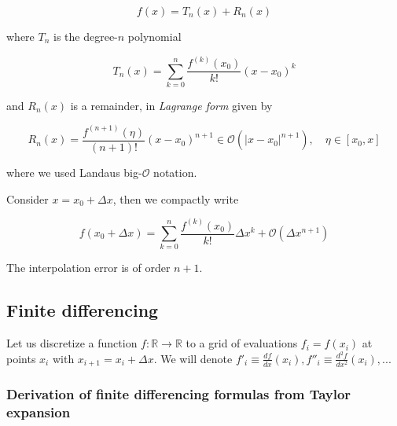 \begin{equation}
    f(x) = T_n(x) + R_n(x)
\end{equation}

where $T_n$ is the degree-$n$ polynomial

\begin{equation}
    T_n(x) = \sum_{k = 0}^{n} \frac{f^{(k)}(x_0)}{k!} (x - x_0)^k
\end{equation}

and $R_n(x)$ is a remainder, in \textit{Lagrange form} given by

\begin{equation}
    R_n(x) = \frac{f^{(n+1)}(\eta)}{(n+1)!}(x-x_0)^{n+1} \in \mathcal{O}(|x-x_0|^{n+1}), \quad \eta \in [x_0, x]
\end{equation}

where we used Landaus big-$\mathcal{O}$ notation.


Consider $x = x_0 + \Delta x$, then we compactly write

\begin{equation}
    \boxed{
    f(x_0 + \Delta x) = \sum_{k = 0}^{n} \frac{f^{(k)}(x_0)}{k!} \Delta x^k + \mathcal{O}(\Delta x^{n+1})
    }
\end{equation}

The interpolation error is of order $n+1$.

\subsection{Finite differencing}

Let us discretize a function $f:\mathbb{R} \to \mathbb{R}$ to a grid of evaluations $f_i = f(x_i)$ at points
$x_i$ with $x_{i+1} = x_{i} + \Delta x$. We will denote $f'_i \equiv \frac{df}{dx}(x_i), f''_i \equiv \frac{d^2f}{dx^2}(x_i),...$

\subsubsection{Derivation of finite differencing formulas from Taylor expansion}

